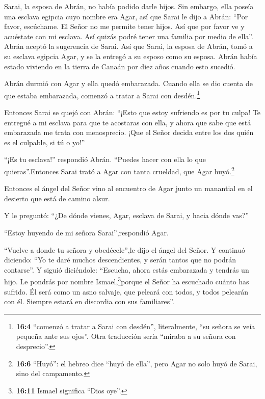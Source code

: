  Sarai, la esposa de Abrán, no había podido darle hijos. Sin
embargo, ella poseía una esclava egipcia cuyo nombre era Agar,
 así que Sarai le dijo a Abrán: ``Por favor, escúchame. El
Señor no me permite tener hijos. Así que por favor ve y acuéstate con mi
esclava. Así quizás podré tener una familia por medio de ella''. Abrán
aceptó la sugerencia de Sarai.  Así que Sarai, la esposa de
Abrán, tomó a su esclava egipcia Agar, y se la entregó a su esposo como
su esposa. Abrán había estado viviendo en la tierra de Canaán por diez
años cuando esto sucedió.

 Abrán durmió con Agar y ella quedó embarazada. Cuando ella
se dio cuenta de que estaba embarazada, comenzó a tratar a Sarai con
desdén.\footnote{\textbf{16:4} ``comenzó a tratar a Sarai con desdén'',
  literalmente, ``su señora se veía pequeña ante sus ojos''. Otra
  traducción sería ``miraba a su señora con desprecio''.}

 Entonces Sarai se quejó con Abrán: ``¡Esto que estoy
sufriendo es por tu culpa! Te entregué a mi esclava para que te
acostaras con ella, y ahora que sabe que está embarazada me trata con
menosprecio. ¡Que el Señor decida entre los dos quién es el culpable, si
tú o yo!''

 ``¡Es tu esclava!'' respondió Abrán. ``Puedes hacer con
ella lo que quieras''.Entonces Sarai trató a Agar con tanta crueldad,
que Agar huyó.\footnote{\textbf{16:6} ``Huyó'': el hebreo dice ``huyó de
  ella'', pero Agar no solo huyó de Sarai, sino del campamento.}

 Entonces el ángel del Señor vino al encuentro de Agar junto
un manantial en el desierto que está de camino alsur.

 Y le preguntó: ``¿De dónde vienes, Agar, esclava de Sarai,
y hacia dónde vas?''

``Estoy huyendo de mi señora Sarai'',respondió Agar.

 ``Vuelve a donde tu señora y obedécele'',le dijo el ángel
del Señor.  Y continuó diciendo: ``Yo te daré muchos
descendientes, y serán tantos que no podrán contarse''.  Y
siguió diciéndole: ``Escucha, ahora estás embarazada y tendrás un hijo.
Le pondrás por nombre Ismael,\footnote{\textbf{16:11} Ismael significa
  ``Dios oye''.}porque el Señor ha escuchado cuánto has sufrido.
 Él será como un asno salvaje, que peleará con todos, y
todos pelearán con él. Siempre estará en discordia con sus familiares''.

